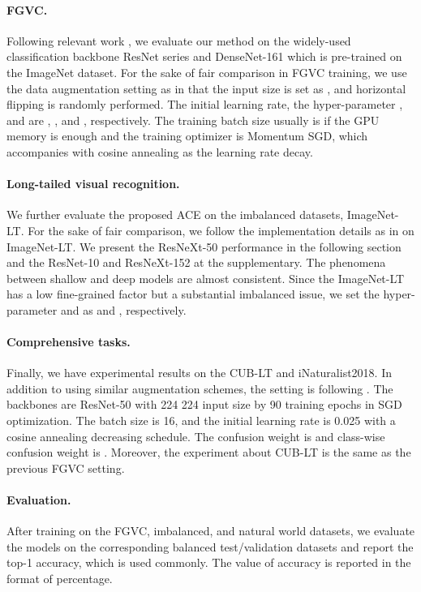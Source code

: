 \documentclass{article}
\begin{document}
\paragraph{FGVC.} Following relevant work \cite{yang2018learning,chen2019destruction,zheng2019looking}, we evaluate our method on the widely-used classification backbone ResNet series \cite{he2016deep} and DenseNet-161 \cite{huang2017densely} which is pre-trained on the ImageNet dataset. For the sake of fair comparison in FGVC training, we use the data augmentation setting as in \citet{chen2019destruction} that the input size is set as  , and horizontal flipping is randomly performed. The initial learning rate, the hyper-parameter , and  are , , and , respectively. The training batch size usually is  if the GPU memory is enough and the training optimizer is Momentum SGD, which accompanies with cosine annealing \cite{loshchilov2016sgdr} as the learning rate decay.
\vspace{-10pt}
\paragraph{Long-tailed visual recognition.} We further evaluate the proposed ACE on the imbalanced datasets, ImageNet-LT. For the sake of fair comparison, we follow the implementation details as in \cite{Kang2020Decoupling} on ImageNet-LT. We present the ResNeXt-50 performance in the following section and the ResNet-10 and ResNeXt-152 at the supplementary. The phenomena between shallow and deep models are almost consistent. Since the ImageNet-LT has a low fine-grained factor but a substantial imbalanced issue, we set the hyper-parameter  and  as  and , respectively.
\vspace{-10pt}
\paragraph{Comprehensive tasks.} Finally, we have experimental results on the CUB-LT and iNaturalist2018. In addition to using similar augmentation schemes, the setting is following \cite{Kang2020Decoupling,cao2019learning}. The backbones are ResNet-50 with 224  224 input size by 90 training epochs in SGD optimization. The batch size is 16, and the initial learning rate is 0.025 with a cosine annealing decreasing schedule. The confusion weight  is  and class-wise confusion weight  is . Moreover, the experiment about CUB-LT is the same as the previous FGVC setting. 
\vspace{-10pt}
\paragraph{Evaluation.} After training on the FGVC, imbalanced, and natural world datasets, we evaluate the models on the corresponding balanced test/validation datasets and report the top-1 accuracy, which is used commonly. The value of accuracy is reported in the format of percentage.
\end{document}
